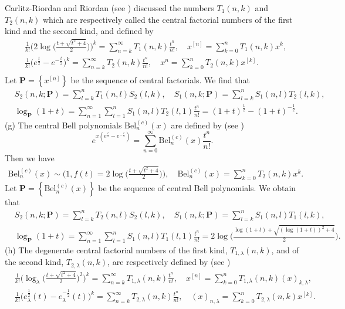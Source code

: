 \documentclass[a4paper,11pt]{amsart}
\begin{document}
Carlitz-Riordan and Riordan (see \cite{3,4,11,23}) discussed the numbers $T_{1}(n,k)$ and $T_{2}(n,k)$ which are respectively called the central factorial numbers of the first kind and the second kind, and defined by
\begin{align*}
&\frac{1}{k!}\bigg(2\log\bigg(\frac{t+\sqrt{t^{2}+4}}{2}\bigg)\bigg)^{k}=\sum_{n=k}^{\infty}T_{1}(n,k)\frac{t^{n}}{n!},\quad  x^{[n]}=\sum_{k=0}^{n}T_{1}(n,k)x^{k}, \\
&\frac{1}{k!}\big(e^{\frac{t}{2}}-e^{-\frac{t}{2}}\big)^{k}=\sum_{n=k}^{\infty}T_{2}(n,k)\frac{t^{n}}{n!}, \quad x^{n}=\sum_{k=0}^{n}T_{2}(n,k)x^{[k]}. \\
\end{align*}
Let $\mathbf{P}=\left\{x^{[n]}\right\}$ be the sequence of central factorials. We find that
\begin{align*}
&S_{2}(n,k;\mathbf{P})=\sum_{l=k}^{n}T_{1}(n,l)S_{2}(l,k),\quad S_{1}(n,k;\mathbf{P})=\sum_{l=k}^{n}S_{1}(n,l)T_{2}(l,k), \\
&\log_{\mathbf{P}}(1+t)=\sum_{n=1}^{\infty}\sum_{l=1}^{n}S_{1}(n,l)T_{2}(l,1)\frac{t^{n}}{n!}=(1+t)^{\frac{1}{2}}-(1+t)^{-\frac{1}{2}}.
\end{align*}
(g) The central Bell polynomials $\mathrm{Bel}_{n}^{(c)}(x)$ are defined by (see \cite{16})
\begin{equation*}
e^{x(e^{\frac{t}{2}}-e^{-\frac{t}{2}})}=\sum_{n=0}^{\infty}\mathrm{Bel}_{n}^{(c)}(x)\frac{t^{n}}{n!}.
\end{equation*}
Then we have
\begin{align*}
\mathrm{Bel}_{n}^{(c)}(x) \sim \Big(1, f(t)=2\log\bigg(\frac{t+\sqrt{t^{2}+4}}{2}\bigg)\Big), \quad \mathrm{Bel}_{n}^{(c)}(x)=\sum_{k=0}^{n}T_{2}(n,k) x^{k}.
\end{align*}
Let $\mathbf{P}=\left\{\mathrm{Bel}_{n}^{(c)}(x)\right\}$ be the sequence of central Bell polynomials. We obtain that
\begin{align*}
&S_{2}(n,k;\mathbf{P})=\sum_{l=k}^{n}T_{2}(n,l)S_{2}(l,k), \quad
S_{1}(n,k;\mathbf{P})=\sum_{l=k}^{n}S_{1}(n,l)T_{1}(l,k), \\
& \log_{\mathbf{P}}(1+t)=\sum_{n=1}^{\infty}\sum_{l=1}^{n}S_{1}(n,l)T_{1}(l,1)\frac{t^{n}}{n!}=2\log\bigg(\frac{\log(1+t)+\sqrt{(\log(1+t))^{2}+4}}{2}\bigg).
\end{align*}
(h) The degenerate central factorial numbers of the first kind, $T_{1,\lambda}(n,k)$, and of the second kind, $T_{2,\lambda}(n,k)$, are respectively defined by (see \cite{17})
\begin{align*}
&\frac{1}{k!}\bigg(\log_{\lambda}\bigg(\frac{t+\sqrt{t^{2}+4}}{2}\bigg)^{2}\bigg)^{k}=\sum_{n=k}^{\infty}T_{1,\lambda}(n,k)\frac{t^{n}}{n!}, \quad x^{[n]}=\sum_{k=0}^{n}T_{1,\lambda}(n,k)(x)_{k, \lambda},\\
&\frac{1}{k!}\big(e_{\lambda}^{\frac{1}{2}}(t)-e_{\lambda}^{-\frac{1}{2}}(t)\big)^{k}=\sum_{n=k}^{\infty}T_{2,\lambda}(n,k)\frac{t^{n}}{n!},\quad (x)_{n,\lambda}=\sum_{k=0}^{n}T_{2,\lambda}(n,k)x^{[k]}.
\end{align*}
\end{document}
